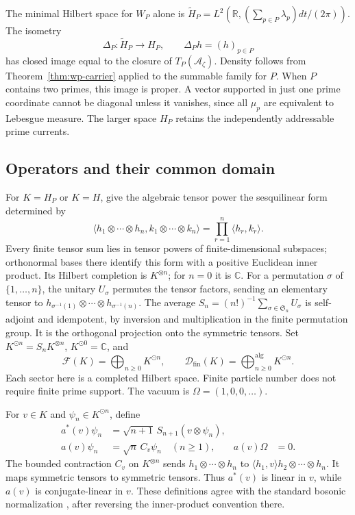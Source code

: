 \documentclass[11pt]{article}
\theoremstyle{definition}
\theoremstyle{remark}
\numberwithin{equation}{section}
\newcommand{\cA}{\mathcal A}
\newcommand{\R}{\mathbb R}
\newcommand{\C}{\mathbb C}
\begin{document}
The minimal Hilbert space for $W_P$ alone is
$\widetilde H_P=L^2(\R,(\sum_{p\in P}\lambda_p)dt/(2\pi))$.
The isometry
\[
 \Delta_P:\widetilde H_P\longrightarrow H_P,\qquad
 \Delta_Ph=(h)_{p\in P}
\]
has closed image equal to the closure of $T_P(\cA_\zeta)$.
Density follows from Theorem~\ref{thm:wp-carrier} applied to the summable
family for $P$.
When $P$ contains two primes, this image is proper.
A vector supported in just one prime coordinate cannot be diagonal
unless it vanishes, since all $\mu_p$ are equivalent to Lebesgue measure.
The larger space $H_P$ retains the independently addressable prime currents.

\subsection{Operators and their common domain}

For $K=H_P$ or $K=H$, give the algebraic tensor power the
sesquilinear form determined by
\[
 \langle h_1\otimes\cdots\otimes h_n,
 k_1\otimes\cdots\otimes k_n\rangle
 =\prod_{r=1}^n\langle h_r,k_r\rangle.
\]
Every finite tensor sum lies in tensor powers of finite-dimensional
subspaces; orthonormal bases there identify this form with a positive
Euclidean inner product.  Its Hilbert completion is $K^{\otimes n}$;
for $n=0$ it is $\C$.
For a permutation $\sigma$ of $\{1,\ldots,n\}$, the unitary
$U_\sigma$ permutes the tensor factors, sending an elementary tensor
to $h_{\sigma^{-1}(1)}\otimes\cdots\otimes h_{\sigma^{-1}(n)}$.
The average
$S_n=(n!)^{-1}\sum_{\sigma\in\mathfrak S_n}U_\sigma$
is self-adjoint and idempotent, by inversion and multiplication in the
finite permutation group.  It is the orthogonal projection onto the
symmetric tensors.
Set $K^{\odot n}=S_nK^{\otimes n}$, $K^{\odot0}=\C$, and
\begin{equation}
 \mathcal F(K)=\bigoplus_{n\geq0}K^{\odot n},\qquad
 \mathcal D_{\mathrm{fin}}(K)
 =\bigoplus_{n\geq0}^{\mathrm{alg}}K^{\odot n}.
 \label{eq:wc-fock-domain}
\end{equation}
Each sector here is a completed Hilbert space.
Finite particle number does not require finite prime support.
The vacuum is $\Omega=(1,0,0,\ldots)$.

For $v\in K$ and $\psi_n\in K^{\odot n}$, define
\begin{equation}
 \begin{aligned}
 a^*(v)\psi_n&=\sqrt{n+1}\,S_{n+1}(v\otimes\psi_n),\\
 a(v)\psi_n&=\sqrt n\,C_v\psi_n\quad(n\geq1),&
 a(v)\Omega&=0.
 \end{aligned}
 \label{eq:wc-creation-definition}
\end{equation}
The bounded contraction $C_v$ on $K^{\otimes n}$ sends
$h_1\otimes\cdots\otimes h_n$ to
$\langle h_1,v\rangle h_2\otimes\cdots\otimes h_n$.
It maps symmetric tensors to symmetric tensors.
Thus $a^*(v)$ is linear in $v$, while $a(v)$ is conjugate-linear in $v$.
These definitions agree with the standard bosonic normalization
\cite[Sections 5.5--5.7, pp.~21--23]{wc-Derezinski}, after reversing
the inner-product convention there.
\end{document}

